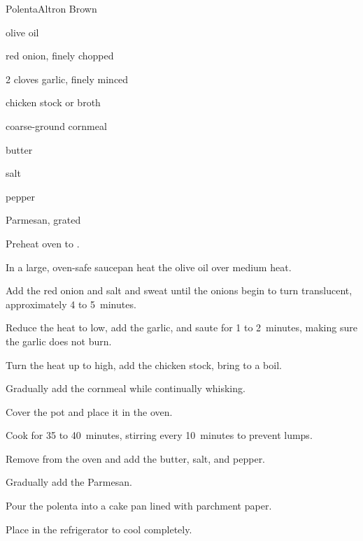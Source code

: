 \begin{recipe}{Polenta}{Altron Brown}{}

\begin{ingredients}
\item {} olive oil
\item \C{\threequarter} red onion, finely chopped
\item 2 cloves garlic, finely minced 
\item {} chicken stock or broth 
\item {} coarse-ground cornmeal 
\item {} butter 
\item \tp{1\half} salt 
\item \tp{\quarter} pepper 
\item \C{\third} Parmesan, grated
\end{ingredients}

\begin{directions}
\item Preheat oven to . 
\item In a large, oven-safe saucepan heat the olive oil over medium heat.
\item Add the red onion and salt and sweat until the onions begin to turn translucent, approximately 4 to 5~minutes.
\item Reduce the heat to low, add the garlic, and saute for 1 to 2~minutes, making sure the garlic does not burn.
\item Turn the heat up to high, add the chicken stock, bring to a boil.
\item Gradually add the cornmeal while continually whisking.
\item Cover the pot and place it in the oven.
\item Cook for 35 to 40~minutes, stirring every 10~minutes to prevent lumps.
\item Remove from the oven and add the butter, salt, and pepper.
\item Gradually add the Parmesan. 
\item Pour the polenta into a cake pan lined with parchment paper.
\item Place in the refrigerator to cool completely. 
\end{directions}
\end{recipe}
